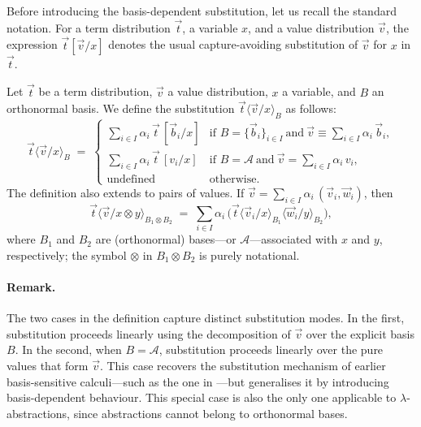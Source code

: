 \documentclass[runningheads,orivec,envcountsame,envcountsect]{llncs}
\newcommand\ansubst[2]{\ensuremath{\langle #1 \rangle_{#2}}}
\newcommand\AbsBasis{\ensuremath{\mathcal{A}}}
\def\Pair#1#2{(#1,#2)} %
\def\ds{\displaystyle}
\begin{document}
Before introducing the basis-dependent substitution, let us recall the
standard notation. For a term distribution $\vec t$, a variable $x$, and a
value distribution $\vec v$, the expression $\vec t[\vec v/x]$ denotes the
usual capture-avoiding substitution of $\vec v$ for $x$ in $\vec t$.

\begin{definition}
  Let $\vec t$ be a term distribution, $\vec v$ a value distribution, $x$ a
  variable, and $B$ an orthonormal basis. We define the substitution
  $\vec t\ansubst{\vec v/x}{B}$ as follows:
  \[
    \vec t\ansubst{\vec v/x}{B} \;=\;
    \begin{cases}
      \ds\sum_{i\in I}\alpha_i\,\vec t\,[\vec b_i/x] &
        \text{if } B=\{\vec b_i\}_{i\in I}\ \text{and}\
        \vec v \equiv \ds\sum_{i\in I}\alpha_i\,\vec b_i,\\[6pt]
      \ds\sum_{i\in I}\alpha_i\,\vec t\,[v_i/x] &
        \text{if } B=\AbsBasis\ \text{and}\
        \vec v = \ds\sum_{i\in I}\alpha_i\,v_i,\\[2pt]
      \text{undefined} & \text{otherwise.}
    \end{cases}
  \]
  The definition also extends to pairs of values. If
  $\vec v=\sum_{i\in I}\alpha_i\,\Pair{\vec v_i}{\vec w_i}$, then
  \[
    \vec t\ansubst{\vec v/x\otimes y}{B_1\otimes B_2}
      \;=\; \sum_{i\in I}\alpha_i\,
      \bigl(\vec t\ansubst{\vec v_i/x}{B_1}\ansubst{\vec w_i/y}{B_2}\bigr),
  \]
  where $B_1$ and $B_2$ are (orthonormal) bases---or $\AbsBasis$---associated
  with $x$ and $y$, respectively; the symbol $\otimes$ in $B_1\otimes B_2$ is
  purely notational.
\end{definition}

\paragraph{Remark.}
The two cases in the definition capture distinct substitution modes.  
In the first, substitution proceeds linearly using the decomposition of
$\vec v$ over the explicit basis $B$.  
In the second, when $B=\AbsBasis$, substitution proceeds linearly over the pure
values that form $\vec v$.  
This case recovers the substitution mechanism of earlier
basis-sensitive calculi---such as the one in
\cite{DiazcaroGuillermoMiquelValironLICS19}---but generalises it by introducing
basis-dependent behaviour.  
This special case is also the only one applicable to
$\lambda$-abstractions, since abstractions cannot belong to orthonormal bases.
\end{document}
